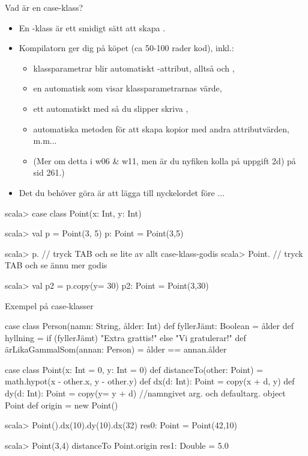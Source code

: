 \begin{Slide}{Vad är en case-klass?}\SlideFontSmall
\setlength{\leftmargini}{0pt}
\begin{itemize}
\item En -klass är ett smidigt sätt att skapa .
\item Kompilatorn ger dig  på köpet (ca 50-100 rader kod), inkl.:
\begin{itemize}\SlideFontTiny
\item klassparametrar blir automatiskt -attribut, alltså  och ,
\item en automatisk  som visar klassparametrarnas värde, 
\item ett automatiskt  med  så du slipper skriva ,
\item automatiska metoden  för att skapa kopior med andra attributvärden, m.m...
\item[] (Mer om detta i w06 \& w11, men är du nyfiken kolla på uppgift 2d) på sid 261.)
\end{itemize}

\pause
\item Det  du behöver göra är att lägga till nyckelordet  före ...
\end{itemize}

\vspace{-0.5em}\begin{REPLnonum}
scala> case class Point(x: Int, y: Int)

scala> val p = Point(3, 5)
p: Point = Point(3,5)

scala> p.  // tryck TAB och se lite av allt case-klass-godis
scala> Point.  // tryck TAB och se ännu mer godis

scala> val p2 = p.copy(y= 30)
p2: Point = Point(3,30)
\end{REPLnonum}


\end{Slide}


\begin{Slide}{Exempel på case-klasser} 
\begin{Code}
case class Person(namn: String, ålder: Int) {
  def fyllerJämt: Boolean = ålder %
  def hyllning = if (fyllerJämt) "Extra grattis!" else "Vi gratulerar!"
  def ärLikaGammalSom(annan: Person) = ålder == annan.ålder
}

case class Point(x: Int = 0, y: Int = 0) {
  def distanceTo(other: Point) = math.hypot(x - other.x, y - other.y)
  def dx(d: Int): Point = copy(x + d, y)
  def dy(d: Int): Point = copy(y= y + d)  //namngivet arg. och defaultarg.
}
object Point { 
  def origin = new Point() 
}
\end{Code}

\begin{REPL}
scala> Point().dx(10).dy(10).dx(32)
res0: Point = Point(42,10)

scala> Point(3,4) distanceTo Point.origin
res1: Double = 5.0

\end{REPL}
\end{Slide}

